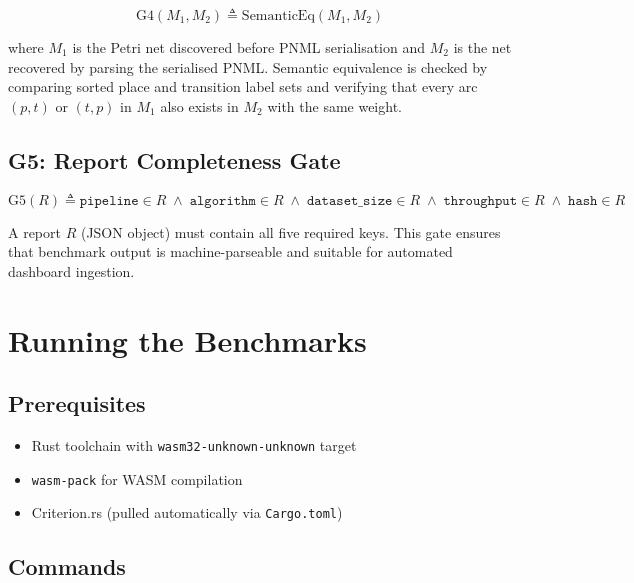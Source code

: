 \documentclass[11pt,a4paper]{article}
\begin{document}
\begin{equation}
  \text{G4}(M_1, M_2) \triangleq \text{SemanticEq}(M_1, M_2)
\end{equation}

where $M_1$ is the Petri net discovered before PNML serialisation and
$M_2$ is the net recovered by parsing the serialised PNML. Semantic
equivalence is checked by comparing sorted place and transition label
sets and verifying that every arc $(p,t)$ or $(t,p)$ in $M_1$ also
exists in $M_2$ with the same weight.

\subsection{G5: Report Completeness Gate}

\begin{equation}
  \text{G5}(R) \triangleq \texttt{pipeline} \in R \;\land\;
    \texttt{algorithm} \in R \;\land\;
    \texttt{dataset\_size} \in R \;\land\;
    \texttt{throughput} \in R \;\land\;
    \texttt{hash} \in R
\end{equation}

A report $R$ (JSON object) must contain all five required keys.
This gate ensures that benchmark output is machine-parseable and
suitable for automated dashboard ingestion.

\section{Running the Benchmarks}
\label{sec:running}

\subsection{Prerequisites}

\begin{itemize}
  \item Rust toolchain with \texttt{wasm32-unknown-unknown} target
  \item \texttt{wasm-pack} for WASM compilation
  \item Criterion.rs (pulled automatically via \texttt{Cargo.toml})
\end{itemize}

\subsection{Commands}
\end{document}
